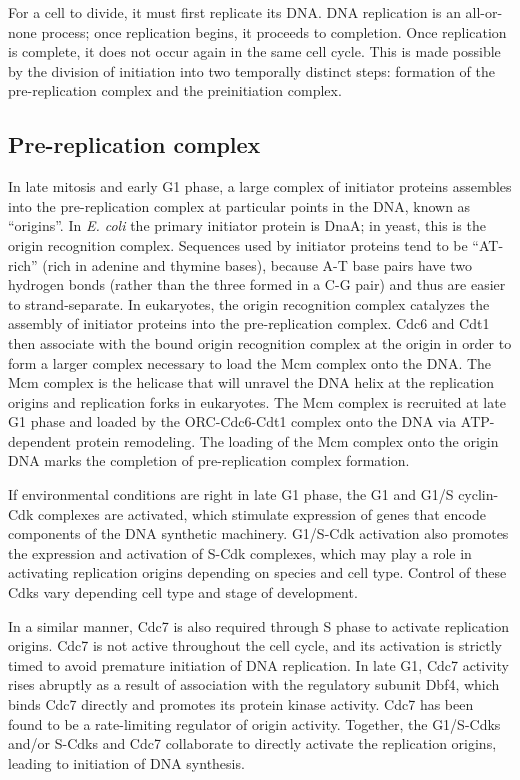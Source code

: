 For a cell to divide, it must first replicate its DNA. DNA replication is an all-or-none process; once replication begins, it proceeds to completion. Once replication is complete, it does not occur again in the same cell cycle. This is made possible by the division of initiation into two temporally distinct steps: formation of the pre-replication complex and the preinitiation complex.

\hypertarget{pre-replication-complex}{%
\subsection{Pre-replication complex}\label{pre-replication-complex}}

In late mitosis and early G1 phase, a large complex of initiator proteins assembles into the pre-replication complex at particular points in the DNA, known as ``origins''. In \emph{E. coli} the primary initiator protein is DnaA; in yeast, this is the origin recognition complex. Sequences used by initiator proteins tend to be ``AT-rich'' (rich in adenine and thymine bases), because A-T base pairs have two hydrogen bonds (rather than the three formed in a C-G pair) and thus are easier to strand-separate. In eukaryotes, the origin recognition complex catalyzes the assembly of initiator proteins into the pre-replication complex. Cdc6 and Cdt1 then associate with the bound origin recognition complex at the origin in order to form a larger complex necessary to load the Mcm complex onto the DNA. The Mcm complex is the helicase that will unravel the DNA helix at the replication origins and replication forks in eukaryotes. The Mcm complex is recruited at late G1 phase and loaded by the ORC-Cdc6-Cdt1 complex onto the DNA via ATP-dependent protein remodeling. The loading of the Mcm complex onto the origin DNA marks the completion of pre-replication complex formation.

If environmental conditions are right in late G1 phase, the G1 and G1/S cyclin-Cdk complexes are activated, which stimulate expression of genes that encode components of the DNA synthetic machinery. G1/S-Cdk activation also promotes the expression and activation of S-Cdk complexes, which may play a role in activating replication origins depending on species and cell type. Control of these Cdks vary depending cell type and stage of development.

In a similar manner, Cdc7 is also required through S phase to activate replication origins. Cdc7 is not active throughout the cell cycle, and its activation is strictly timed to avoid premature initiation of DNA replication. In late G1, Cdc7 activity rises abruptly as a result of association with the regulatory subunit Dbf4, which binds Cdc7 directly and promotes its protein kinase activity. Cdc7 has been found to be a rate-limiting regulator of origin activity. Together, the G1/S-Cdks and/or S-Cdks and Cdc7 collaborate to directly activate the replication origins, leading to initiation of DNA synthesis.

